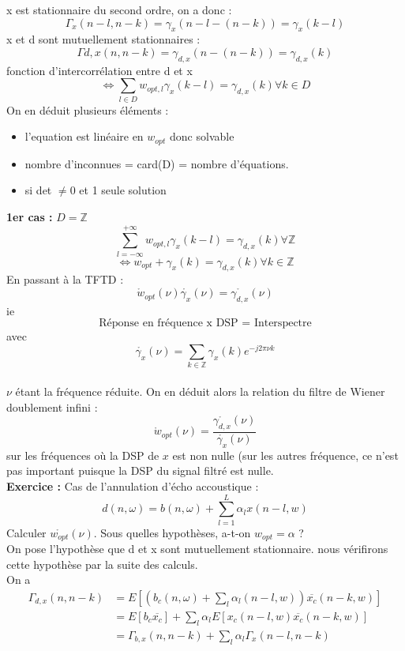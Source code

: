 \documentclass[12pt]{article}
\begin{document}
x est stationnaire du second ordre, on a donc : 
$$\Gamma_x(n-l,n-k) = \gamma_x(n-l-(n-k))=\gamma_x(k-l)$$
x et d sont mutuellement stationnaires :
$$\Gamma{d,x}(n,n-k) = \gamma_{d,x}(n-(n-k)) = \gamma_{d,x}(k)$$ fonction d'intercorrélation entre d et x
$$\Leftrightarrow \boxed{\sum_{l\in D} w_{opt,l} \gamma_x(k-l) = \gamma_{d,x}(k) \forall k \in D}$$
On en déduit plusieurs éléments :
\begin{itemize}
    \item l'equation est linéaire en $w_{opt}$ donc solvable
    \item nombre d'inconnues = card(D) = nombre d'équations.
    \item si det $\neq 0$ et 1 seule solution
\end{itemize}
\textbf{1er cas :} $D = \mathbb{Z}$\\
$$\sum_{l=-\infty}^{+\infty} w_{opt,l} \gamma_x(k-l)=\gamma_{d,x}(k) \forall \mathbb{Z}$$
$$\Leftrightarrow w_{opt}+\gamma_x(k) = \gamma_{d,x}(k) \forall k \in \mathbb{Z}$$
En passant à la TFTD : 
$$\mathring{w}_{opt}(\nu) \mathring{\gamma_x}(\nu)=\mathring{\gamma_{d,x}}(\nu)$$
ie $$\text{Réponse en fréquence x DSP } = \text{ Interspectre}$$
avec $$\mathring{\gamma_x}(\nu)= \sum_{k \in \mathbb{Z}} \gamma_x(k) e^{-j2\pi \nu k}$$\\
$\nu$ étant la fréquence réduite.
On en déduit alors la relation du filtre de Wiener doublement infini :
$$\boxed{\mathring{w}_{opt}(\nu) = \frac{\mathring{\gamma_{d,x}}(\nu)}{\mathring{\gamma_x}(\nu)}}$$ sur les fréquences où la DSP de $x$ est non nulle (sur les autres fréquence, ce n'est pas important puisque la DSP du signal filtré est nulle.\\
\textbf{Exercice :} Cas de l'annulation d'écho accoustique :
$$d(n,\omega) = b(n,\omega) + \sum_{l=1}^L \alpha_l x(n-l,w)$$
Calculer $\mathring{w_{opt}}(\nu)$. Sous quelles hypothèses, a-t-on $w_{opt} = \alpha$ ?
\\
On pose l'hypothèse que d et x sont mutuellement stationnaire. nous vérifirons cette hypothèse par la suite des calculs.\\
On a 
\begin{align}
    \Gamma_{d,x}(n,n-k) &= E\left[ (b_c(n,\omega)+ \sum_l \alpha_l (n-l,w)) \overline{x_c} (n-k,w) \right] \nonumber \\
    &= E[b_c \overline{x_c}] + \sum_l \alpha_l E\left[ x_c(n-l,w) \overline{x_c}(n-k,w) \right] \nonumber \\
    &= \Gamma_{b,x}(n,n-k) + \sum_l \alpha_l \Gamma_x(n-l,n-k) \nonumber 
\end{align}
\end{document}
